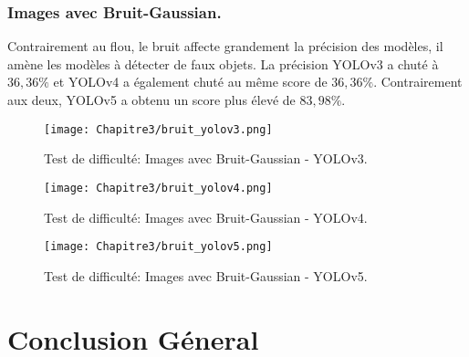           \subsubsection{Images avec Bruit-Gaussian.}
          Contrairement au flou, le bruit affecte grandement la précision des modèles, il amène les modèles à détecter de faux objets.
          La précision YOLOv3 a chuté à $36,36\%$ et YOLOv4 a également chuté au même score de $36,36\%$. Contrairement aux deux, YOLOv5 a obtenu un score plus élevé de $83,98\%$.
          \begin{figure}[H]
                    \centering
                    \texttt{[image: Chapitre3/bruit\_yolov3.png]}
                    \caption{Test de difficulté: Images avec Bruit-Gaussian - YOLOv3.}
                    \label{bruit_y3}
                    \end{figure}
          \begin{figure}[H]
                    \centering
                    \texttt{[image: Chapitre3/bruit\_yolov4.png]}
                    \caption{Test de difficulté: Images avec Bruit-Gaussian - YOLOv4.}
                    \label{bruit_y4}
                    \end{figure}
          \begin{figure}[H]
                    \centering
                    \texttt{[image: Chapitre3/bruit\_yolov5.png]}
                    \caption{Test de difficulté: Images avec Bruit-Gaussian - YOLOv5.}
                    \label{bruit_y5}
                    \end{figure}


\section{Conclusion Géneral}
